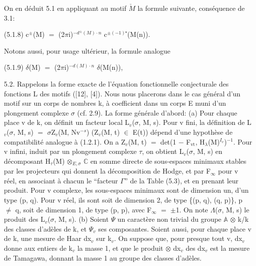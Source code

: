 \documentclass[10pt,twoside]{article}
\begin{document}
On en déduit 5.1 en appliquant au motif \ensuremath{\check{M}} la formule suivante, conséquence de 3.1:\par
(5.1.8)    c\ensuremath{^{±}}(M) \ensuremath{=} (2\ensuremath{π}i)\ensuremath{^{−d^±(M)·n}} c\ensuremath{^{±(−1)ⁿ}}(M(n)).\par
Notons aussi, pour usage ultérieur, la formule analogue\par
(5.1.9)    \ensuremath{δ}(M) \ensuremath{=} (2\ensuremath{π}i)\ensuremath{^{−d(M)·n}} \ensuremath{δ}(M(n)),\par
5.2. Rappelons la forme exacte de l’équation fonctionnelle conjecturale des fonctions L des motifs ([12], [4]). Nous nous placerons dans le cas général d’un motif sur un corps de nombres k, à coefficient dans un corps E muni d’un plongement complexe \ensuremath{σ} (cf. 2.9). La forme générale d’abord: (a) Pour chaque place v de k, on définit un facteur local L\ensuremath{_{v}}(\ensuremath{σ}, M, s). Pour v fini, la définition de L\ensuremath{_{v}}(\ensuremath{σ}, M, s) \ensuremath{=} \ensuremath{σ}Z\ensuremath{_{v}}(M, Nv\ensuremath{^{−s}}) (Z\ensuremath{_{v}}(M, t) \ensuremath{∈} E(t)) dépend d’une hypothèse de compatibilité analogue à (1.2.1). On a Z\ensuremath{_{v}}(M, t) \ensuremath{=} det(1 \ensuremath{−} F\ensuremath{_{\mathrm{vt}}}, H\ensuremath{_{λ}}(M)\ensuremath{^{I_v}})\ensuremath{^{-1}}. Pour v infini, induit par un plongement complexe \ensuremath{τ}, on obtient L\ensuremath{_{v}}(\ensuremath{σ}, M, s) en décomposant H\ensuremath{_{τ}}(M) \ensuremath{⊗}\ensuremath{_{E,σ}} \ensuremath{ℂ} en somme directe de sous-espaces minimaux stables par les projecteurs qui donnent la décomposition de Hodge, et par F\ensuremath{_{∞}} pour v réel, en associant à chacun le “facteur \ensuremath{Γ}” de la Table (5.3), et en prenant leur produit. Pour v complexe, les sous-espaces minimaux sont de dimension un, d’un type (p, q). Pour v réel, ils sont soit de dimension 2, de type \{(p, q), (q, p)\}, p \ensuremath{≠} q, soit de dimension 1, de type (p, p), avec F\ensuremath{_{∞}} \ensuremath{=} \ensuremath{±}1. On note \ensuremath{Λ}(\ensuremath{σ}, M, s) le produit des L\ensuremath{_{v}}(\ensuremath{σ}, M, s). (b) Soient \ensuremath{Ψ} un caractère non trivial du groupe \ensuremath{𝔸} \ensuremath{⊗} k/k des classes d’adèles de k, et \ensuremath{Ψ}\ensuremath{_{v}} ses composantes. Soient aussi, pour chaque place v de k, une mesure de Haar dx\ensuremath{_{v}} sur k\ensuremath{_{v}}. On suppose que, pour presque tout v, dx\ensuremath{_{v}} donne aux entiers de k\ensuremath{_{v}} la masse 1, et que le produit \ensuremath{⊗} dx\ensuremath{_{v}} des dx\ensuremath{_{v}} est la mesure de Tamagawa, donnant la masse 1 au groupe des classes d’adèles.\par
\end{document}
